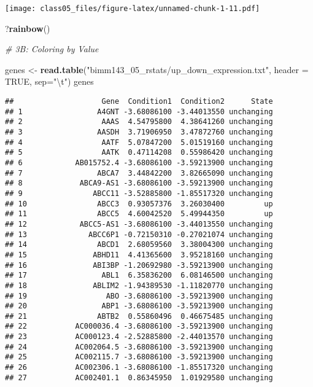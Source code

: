 \documentclass[]{article}
\newenvironment{Shaded}{\begin{snugshade}}{\end{snugshade}}
\newcommand{\KeywordTok}[1]{\textcolor[rgb]{0.13,0.29,0.53}{\textbf{#1}}}
\newcommand{\DataTypeTok}[1]{\textcolor[rgb]{0.13,0.29,0.53}{#1}}
\newcommand{\CharTok}[1]{\textcolor[rgb]{0.31,0.60,0.02}{#1}}
\newcommand{\StringTok}[1]{\textcolor[rgb]{0.31,0.60,0.02}{#1}}
\newcommand{\CommentTok}[1]{\textcolor[rgb]{0.56,0.35,0.01}{\textit{#1}}}
\newcommand{\OtherTok}[1]{\textcolor[rgb]{0.56,0.35,0.01}{#1}}
\newcommand{\NormalTok}[1]{#1}
\begin{document}
\texttt{[image: class05\_files/figure-latex/unnamed-chunk-1-11.pdf]}

\begin{Shaded}
\begin{Highlighting}[]
\NormalTok{?}\KeywordTok{rainbow}\NormalTok{()}

\CommentTok{# 3B: Coloring by Value}

\NormalTok{genes <-}\StringTok{ }\KeywordTok{read.table}\NormalTok{(}\StringTok{"bimm143_05_rstats/up_down_expression.txt"}\NormalTok{, }\DataTypeTok{header =} \OtherTok{TRUE}\NormalTok{, }\DataTypeTok{sep=}\StringTok{"}\CharTok{\textbackslash{}t}\StringTok{"}\NormalTok{)}
\NormalTok{genes}
\end{Highlighting}
\end{Shaded}

\begin{verbatim}
##                    Gene  Condition1  Condition2      State
## 1                 A4GNT -3.68086100 -3.44013550 unchanging
## 2                  AAAS  4.54795800  4.38641260 unchanging
## 3                 AASDH  3.71906950  3.47872760 unchanging
## 4                  AATF  5.07847200  5.01519160 unchanging
## 5                  AATK  0.47114208  0.55986420 unchanging
## 6            AB015752.4 -3.68086100 -3.59213900 unchanging
## 7                 ABCA7  3.44842200  3.82665090 unchanging
## 8             ABCA9-AS1 -3.68086100 -3.59213900 unchanging
## 9                ABCC11 -3.52885800 -1.85517320 unchanging
## 10                ABCC3  0.93057376  3.26030400         up
## 11                ABCC5  4.60042520  5.49944350         up
## 12            ABCC5-AS1 -3.68086100 -3.44013550 unchanging
## 13              ABCC6P1 -0.72150310 -0.27021074 unchanging
## 14                ABCD1  2.68059560  3.38004300 unchanging
## 15               ABHD11  4.41365600  3.95218160 unchanging
## 16               ABI3BP -1.20692980 -3.59213900 unchanging
## 17                 ABL1  6.35836200  6.08146500 unchanging
## 18               ABLIM2 -1.94389530 -1.11820770 unchanging
## 19                  ABO -3.68086100 -3.59213900 unchanging
## 20                 ABP1 -3.68086100 -3.59213900 unchanging
## 21                ABTB2  0.55860496  0.46675485 unchanging
## 22           AC000036.4 -3.68086100 -3.59213900 unchanging
## 23           AC000123.4 -2.52885800 -2.44013570 unchanging
## 24           AC002064.5 -3.68086100 -3.59213900 unchanging
## 25           AC002115.7 -3.68086100 -3.59213900 unchanging
## 26           AC002306.1 -3.68086100 -1.85517320 unchanging
## 27           AC002401.1  0.86345950  1.01929580 unchanging

\end{verbatim}
\end{document}
